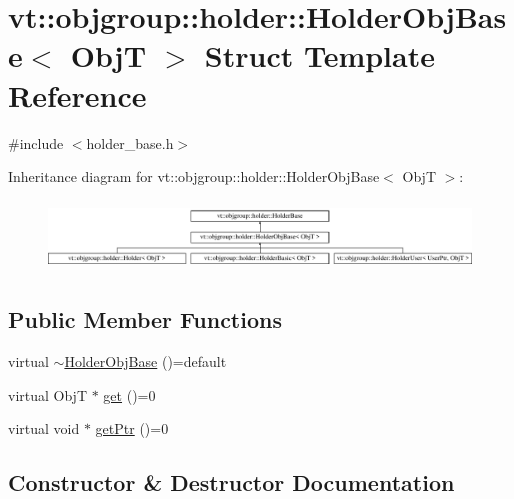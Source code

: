 \hypertarget{structvt_1_1objgroup_1_1holder_1_1_holder_obj_base}{}\section{vt\+:\+:objgroup\+:\+:holder\+:\+:Holder\+Obj\+Base$<$ ObjT $>$ Struct Template Reference}
\label{structvt_1_1objgroup_1_1holder_1_1_holder_obj_base}


{\ttfamily \#include $<$holder\+\_\+base.\+h$>$}

Inheritance diagram for vt\+:\+:objgroup\+:\+:holder\+:\+:Holder\+Obj\+Base$<$ ObjT $>$\+:\begin{figure}[H]
\begin{center}
\leavevmode
\includegraphics[height=1.866667cm]{structvt_1_1objgroup_1_1holder_1_1_holder_obj_base}
\end{center}
\end{figure}
\subsection*{Public Member Functions}
\begin{DoxyCompactItemize}
\item 
virtual \hyperlink{structvt_1_1objgroup_1_1holder_1_1_holder_obj_base_a368d2b1e12c87f11475ecf13dcb66129}{$\sim$\+Holder\+Obj\+Base} ()=default
\item 
virtual ObjT $\ast$ \hyperlink{structvt_1_1objgroup_1_1holder_1_1_holder_obj_base_a4b350b0126259d31a62fd426a08f6698}{get} ()=0
\item 
virtual void $\ast$ \hyperlink{structvt_1_1objgroup_1_1holder_1_1_holder_obj_base_aa08fdb3d076043c004e3674a136f84c3}{get\+Ptr} ()=0
\end{DoxyCompactItemize}


\subsection{Constructor \& Destructor Documentation}
\mbox{\label{structvt_1_1objgroup_1_1holder_1_1_holder_obj_base_a368d2b1e12c87f11475ecf13dcb66129}} 
